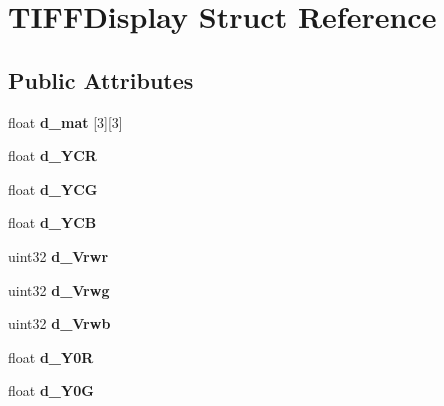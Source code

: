 \hypertarget{structTIFFDisplay}{}\section{T\+I\+F\+F\+Display Struct Reference}
\label{structTIFFDisplay}
\subsection*{Public Attributes}
\begin{DoxyCompactItemize}
\item 
\mbox{\label{structTIFFDisplay_a154c17a44e601abb0e3f7fa0679229c9}} 
float {\bfseries d\+\_\+mat} \mbox{[}3\mbox{]}\mbox{[}3\mbox{]}
\item 
\mbox{\label{structTIFFDisplay_a7f9ccfdd5386bb77c87fcbff291e68fc}} 
float {\bfseries d\+\_\+\+Y\+CR}
\item 
\mbox{\label{structTIFFDisplay_a791a7d81bfd0ebbf7749e22b2ab1121e}} 
float {\bfseries d\+\_\+\+Y\+CG}
\item 
\mbox{\label{structTIFFDisplay_a12a8b0e5283b9d1407b120180fc697d9}} 
float {\bfseries d\+\_\+\+Y\+CB}
\item 
\mbox{\label{structTIFFDisplay_a0d07c9db94e97aa0dc2b23000404d6db}} 
uint32 {\bfseries d\+\_\+\+Vrwr}
\item 
\mbox{\label{structTIFFDisplay_add6f95e419c169a5b3b19988c7d96a82}} 
uint32 {\bfseries d\+\_\+\+Vrwg}
\item 
\mbox{\label{structTIFFDisplay_a21fa314b8d12bb6cb6182b941fc2e3ff}} 
uint32 {\bfseries d\+\_\+\+Vrwb}
\item 
\mbox{\label{structTIFFDisplay_a42080c0565893b1b57585d1114ffed2e}} 
float {\bfseries d\+\_\+\+Y0R}
\item 
\mbox{\label{structTIFFDisplay_a8a3da16732ffba884dac2061b33b3cc9}} 
float {\bfseries d\+\_\+\+Y0G}
\item 
\mbox{\label{structTIFFDisplay_a9286c57976cbc5130794e8d7ebc3fca9}} 

\end{DoxyCompactItemize}
